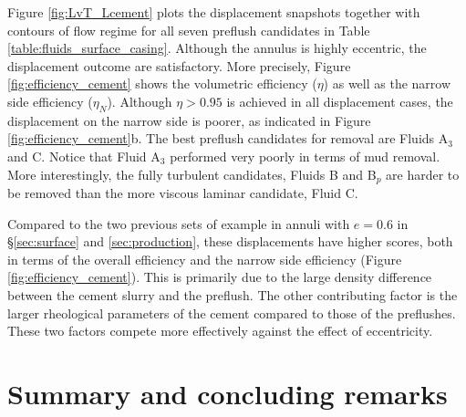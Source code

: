 \documentclass[review]{elsarticle}
\begin{document}
Figure \ref{fig:LvT_Lcement} plots the displacement snapshots together with contours of flow regime for all seven preflush candidates in Table \ref{table:fluids_surface_casing}. Although the annulus is highly  eccentric, the displacement outcome are satisfactory. More precisely, Figure \ref{fig:efficiency_cement} shows the volumetric efficiency ($\eta$) as well as the narrow side efficiency ($\eta_N$). Although $\eta>0.95$ is achieved in all displacement cases, the displacement on the narrow side is poorer, as indicated in Figure \ref{fig:efficiency_cement}b. The best preflush candidates for removal are Fluids A$_3$ and C. Notice that Fluid A$_3$ performed very poorly in terms of mud removal. More interestingly, the fully turbulent candidates, Fluids B and B$_p$ are harder to be removed than the more viscous laminar candidate, Fluid C.

Compared to the two previous sets of example in annuli with $e=0.6$ in \S\ref{sec:surface} and \ref{sec:production}, these displacements have higher scores, both in terms of the overall efficiency and the narrow side efficiency (Figure \ref{fig:efficiency_cement}). This is primarily due to the large density difference between the cement slurry and the preflush. The other contributing factor is the larger rheological parameters of the cement compared to those of the preflushes. These two factors compete more effectively against the effect of eccentricity.

\section{Summary and concluding remarks}
\label{sec:conclusion}
\end{document}
